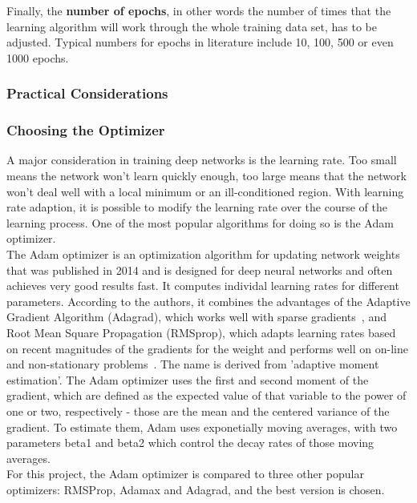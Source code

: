 \documentclass[
	a4paper,
	pagesize,
	pdftex,
	12pt,
	twoside, %
	BCOR=5mm, %
	ngerman,
	fleqn,
	final,
	]{scrartcl}
\begin{document}
Finally, the \textbf{number of epochs}, in other words the number of times that the learning algorithm will work through the whole training data set, has to be adjusted. Typical numbers for epochs in literature include 10, 100, 500 or even 1000 epochs.\\

\subsubsection{Practical Considerations}

\subsubsection{Choosing the Optimizer}

A major consideration in training deep networks is the learning rate. Too small means the network won't learn quickly enough, too large means that the network won't deal well with a local minimum or an ill-conditioned region. With learning rate adaption, it is possible to modify the learning rate over the course of the learning process. One of the most popular algorithms for doing so is the Adam optimizer.\\
The Adam optimizer is an optimization algorithm for updating network weights that was published in 2014 \cite{Kingma.2014}
and is designed for deep neural networks and often achieves very good results fast. It computes individal learning rates for different parameters. According to the authors, it combines the advantages of the Adaptive Gradient Algorithm (Adagrad), which works well with sparse gradients~\cite{Duchi.2011}, and Root Mean Square Propagation (RMSprop), which adapts learning rates based on recent magnitudes of the gradients for the weight and performs well on on-line and non-stationary problems~\cite{Tieleman.2012}. The name is derived from 'adaptive moment estimation'. The Adam optimizer uses the first and second moment of the gradient, which are defined as the expected value of that variable to the power of one or two, respectively - those are the mean and the centered variance of the gradient. To estimate them, Adam uses exponetially moving averages, with two parameters beta1 and beta2 which control the decay rates of those moving averages. \\
For this project, the Adam optimizer is compared to three other popular optimizers: RMSProp, Adamax and Adagrad, and the best version is chosen.
\end{document}
